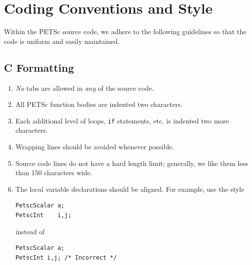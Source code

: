 \section{Coding Conventions and Style}
Within the PETSc source code, we adhere to the following guidelines
so that the code is uniform and easily maintained.

\subsection{C Formatting}
\begin{enumerate}
\item {\em No} tabs are allowed in {\em any} of the source code.
\item All PETSc function bodies are indented two characters.
\item Each additional level of loops, \lstinline{if} statements, etc. is indented
      two more characters.
\item Wrapping lines should be avoided whenever possible.
\item Source code lines do not have a hard length limit; generally, we like them less than 150 characters wide.
\item The local variable declarations should be aligned. For example,
      use the style 
\begin{lstlisting}
PetscScalar a;
PetscInt    i,j;
\end{lstlisting}
instead of
\begin{lstlisting}
PetscScalar a;
PetscInt i,j; /* Incorrect */
\end{lstlisting}


\end{enumerate}
